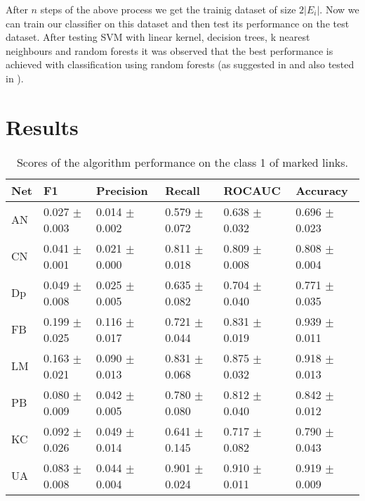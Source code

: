 \documentclass{llncs}
\begin{document}
After $n$ steps of the above process we get the trainig dataset of size $2 |E_i|$. Now we can train our classifier on this dataset and then test its performance on the test dataset. After testing SVM with linear kernel, decision trees, k nearest neighbours and random forests it was observed that the best performance is achieved with classification using random forests (as suggested in \cite{features-for-sl} and also tested in \cite{ipynb-sl}).
%
\section{Results}
%
\setlength{\tabcolsep}{5pt}
\renewcommand{\arraystretch}{1.5}
\begin{table}
\begin{center}
\caption{Scores of the algorithm performance on the class 1 of marked links.}
\begin{tabular}{| l | l | l | l | l | l |}
\hline
Net & F1 & Precision & Recall & ROCAUC & Accuracy  \\ \hline
AN & 0.027 $\pm$ 0.003 & 0.014 $\pm$ 0.002 & 0.579 $\pm$ 0.072 & 0.638 $\pm$ 0.032 & 0.696 $\pm$ 0.023  \\ \hline
CN & 0.041 $\pm$ 0.001 & 0.021 $\pm$ 0.000 & 0.811 $\pm$ 0.018 & 0.809 $\pm$ 0.008 & 0.808 $\pm$ 0.004  \\ \hline
Dp & 0.049 $\pm$ 0.008 & 0.025 $\pm$ 0.005 & 0.635 $\pm$ 0.082 & 0.704 $\pm$ 0.040 & 0.771 $\pm$ 0.035  \\ \hline
FB & 0.199 $\pm$ 0.025 & 0.116 $\pm$ 0.017 & 0.721 $\pm$ 0.044 & 0.831 $\pm$ 0.019 & 0.939 $\pm$ 0.011  \\ \hline
LM & 0.163 $\pm$ 0.021 & 0.090 $\pm$ 0.013 & 0.831 $\pm$ 0.068 & 0.875 $\pm$ 0.032 & 0.918 $\pm$ 0.013 \\ \hline
PB & 0.080 $\pm$ 0.009 & 0.042 $\pm$ 0.005 & 0.780 $\pm$ 0.080 & 0.812 $\pm$ 0.040 & 0.842 $\pm$ 0.012  \\ \hline
KC & 0.092 $\pm$ 0.026 & 0.049 $\pm$ 0.014 & 0.641 $\pm$ 0.145 & 0.717 $\pm$ 0.082 & 0.790 $\pm$  0.043 \\ \hline
UA & 0.083 $\pm$ 0.008 & 0.044 $\pm$ 0.004 & 0.901 $\pm$ 0.024 & 0.910 $\pm$ 0.011 & 0.919 $\pm$ 0.009  \\ 
\hline
\end{tabular}
\end{center}
\end{table}
%
\end{document}
